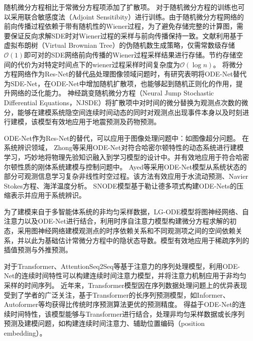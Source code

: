 随机微分方程相比于常微分方程项添加了扩散项。
对于随机微分方程的训练也可以采用联合敏感度法（Adjoint Sensitibity）进行训练\cite{li2020scalable}。由于随机微分方程网络的前向传播过程依赖于带有随机性的Wiener过程，为了避免存储完整的计算图，需要保证反向求解SDE时对Wiener过程的采样与前向传播保持一致。文献\cite{li2020scalable}利用基于虚拟布朗树（Virtual Brownian Tree）的伪随机数生成策略，仅需常数级存储$\mathcal{O}(1)$即可对的SDE网络前向传播的Wiener过程采样结果进行存储。节约存储空间的代价为对特定时间点下的wiener过程采样时间复杂度为$\mathcal{O}(\log n)$。
将微分方程网络作为Res-Net的替代品处理图像领域问题时，有研究表明将ODE-Net替代为SDE-Net，在ODE-Net中增加随机扩散项，也能够起到随机正则化的作用，提升网络的泛化能力\cite{Oganesyan2020}。
神经跳变随机微分方程（Neural Jump Stochastic Differential Equations，NJSDE）\cite{Jia2019}将扩散项中对时间的微分替换为观测点次数的微分，能够在建模系统隐空间连续时间动态的同时对观测点出现事件本身以及时刻进行建模，该模型有效地应用于地震预测及药物预测。

ODE-Net作为Res-Net的替代，可以应用于图像处理问题中：如图像超分问题\cite{OISR,jia2019focnet}。
在系统辨识领域，
Zhong等\cite{zhong2019symplectic}采用ODE-Net对符合哈密尔顿特性的动态系统进行建模学习，巧妙地将物理先验知识融入到学习模型的设计中。并有效地应用于符合哈密尔顿性质的刚体系统建模与控制问题中。
Ayed等\cite{ayed2019learning}采用ODE-Net模型从系统状态的部分可观测信息学习复杂非线性时空过程。该方法有效应用于水流动预测、Navier Stokes方程、海洋温度分析。
SNODE\cite{Quaglino2019}模型基于勒让德多项式构建ODE-Nets的压缩表示并应用于系统辨识。

为了建模来自于多智能体系统的非均匀采样数据，LG-ODE模型\cite{Huang2020}将图神经网络、自注意力以及ODE-Net进行结合，利用时序自注意力模型构建微分方程求解的初态，采用图神经网络建模观测点的时序依赖关系和不同观测项之间的空间依赖关系，并以此为基础估计常微分方程中的隐状态导数。模型有效地应用于稀疏序列的插值预测与外推预测。


对于Transformer、AttentionSeq2Seq等基于注意力的序列处理模型，利用ODE-Net的连续时间特性可以构建连续时间注意力模型\cite{chen2021continuous}，并将注意力机制应用于非均匀采样的时间序列。
近年来，Transformer模型\cite{Vaswani2017}因在序列数据处理问题上的优异表现受到了学者的广泛关注，基于Transformer的长序列预测模型，如Informer\cite{Zhou2020}、Autoformer\cite{Wu2021}等均获得比传统时序预测算法更优的预测精度。
得益于ODE-Net的连续时间特性，该模型能够与Transformer进行结合，处理非均匀采样数据或长序列预测及建模问题，如构建连续时间注意力\cite{chen2021continuous}、辅助位置编码（position embedding）\cite{Liu2020}。

